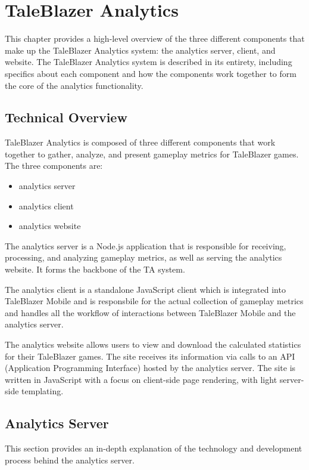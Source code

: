 \chapter{TaleBlazer Analytics}

This chapter provides a high-level overview of the three different components that make up the TaleBlazer Analytics system: the analytics server, client, and website. The TaleBlazer Analytics system is described in its entirety, including specifics about each component and how the components work together to form the core of the analytics functionality. 

\section{Technical Overview} 

TaleBlazer Analytics is composed of three different components that work together to gather, analyze, and present gameplay metrics for TaleBlazer games. The three components are: 
	\begin{itemize}
		\item analytics server
		\item analytics client
		\item analytics website
	\end{itemize}

The analytics server is a Node.js application that is responsible for receiving, processing, and analyzing gameplay metrics, as well as serving the analytics website. It forms the backbone of the TA system. 

The analytics client is a standalone JavaScript client which is integrated into TaleBlazer Mobile and is responsbile for the actual collection of gameplay metrics and handles all the workflow of interactions between TaleBlazer Mobile and the analytics server. 

The analytics website allows users to view and download the calculated statistics for their TaleBlazer games. The site receives its information via calls to an API (Application Programming Interface) hosted by the analytics server. The site is written in JavaScript with a focus on client-side page rendering, with light server-side templating. 

\section{Analytics Server}

This section provides an in-depth explanation of the technology and development process behind the analytics server.

